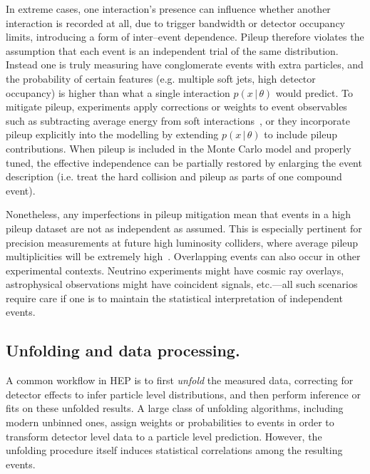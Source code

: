         In extreme cases, one interaction's presence can influence whether another interaction is recorded at all, due to trigger bandwidth or detector occupancy limits, introducing a form of inter--event dependence.
        Pileup therefore violates the assumption that each event is an independent trial of the same distribution.
        Instead one is truly measuring have conglomerate events with extra particles, and the probability of certain features (e.g. multiple soft jets, high detector occupancy) is higher than what a single interaction $p(x\,|\,\theta)$ would predict.
        To mitigate pileup, experiments apply corrections or weights to event observables such as subtracting average energy from soft interactions~\cite{CMS:2016lmd, CMS:2020cmk, Cacciari:2014gra}, or they incorporate pileup explicitly into the modelling by extending $p(x\,|\,\theta)$ to include pileup contributions.
        When pileup is included in the Monte Carlo model and properly tuned, the effective independence can be partially restored by enlarging the event description (i.e. treat the hard collision and pileup as parts of one compound event).
        
        Nonetheless, any imperfections in pileup mitigation mean that events in a high pileup dataset are not as independent as assumed.
        This is especially pertinent for precision measurements at future high luminosity colliders, where average pileup multiplicities will be extremely high~\cite{Lobanov:2020hhr, Komiske2018PileupPUMML, Maier:2021ymx, CMSCollaboration2024LuminosityExperiment, Kuehn:2021uzo}.
        Overlapping events can also occur in other experimental contexts.
        Neutrino experiments might have cosmic ray overlays, astrophysical observations might have coincident signals, etc.---all such scenarios require care if one is to maintain the statistical interpretation of independent events.
        
    \subsection{Unfolding and data processing.}
        A common workflow in HEP is to first \emph{unfold} the measured data, correcting for detector effects to infer particle level distributions, and then perform inference or fits on these unfolded results.
        A large class of unfolding algorithms, including modern unbinned ones, assign weights or probabilities to events in order to transform detector level data to a particle level prediction.
        However, the unfolding procedure itself induces statistical correlations among the resulting events.
        
